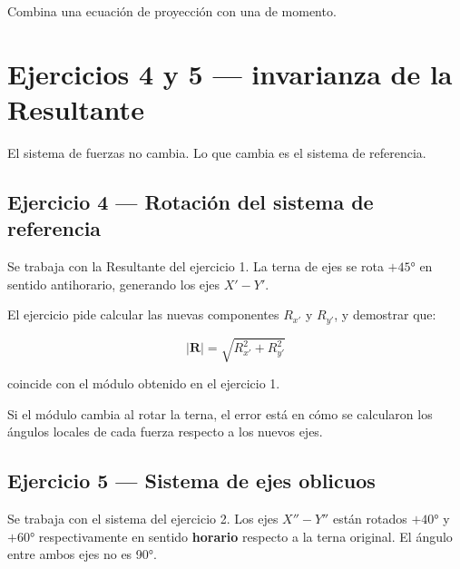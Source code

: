 \documentclass[
  spanish,
  11pt,
  a4paper,
]{article}
\begin{document}
Combina una ecuación de proyección con una de momento.

\section{Ejercicios 4 y 5 --- invarianza de la
Resultante}\label{ejercicios-4-y-5-invarianza-de-la-resultante}

El sistema de fuerzas no cambia. Lo que cambia es el sistema de
referencia.

\subsection{Ejercicio 4 --- Rotación del sistema de
referencia}\label{ejercicio-4-rotaciuxf3n-del-sistema-de-referencia}

Se trabaja con la Resultante del ejercicio 1. La terna de ejes se rota
\(+45°\) en sentido antihorario, generando los ejes \(X' - Y'\).

El ejercicio pide calcular las nuevas componentes \(R_{x'}\) y
\(R_{y'}\), y demostrar que:

\[|\mathbf{R}| = \sqrt{R_{x'}^2 + R_{y'}^2}\]

coincide con el módulo obtenido en el ejercicio 1.

\begin{tcolorbox}[enhanced jigsaw, bottomrule=.15mm, bottomtitle=1mm, titlerule=0mm, leftrule=.75mm, rightrule=.15mm, title=\textcolor{quarto-callout-tip-color}{\faLightbulb}\hspace{0.5em}{Tip}, coltitle=black, colframe=quarto-callout-tip-color-frame, left=2mm, opacitybacktitle=0.6, opacityback=0, toptitle=1mm, toprule=.15mm, colbacktitle=quarto-callout-tip-color!10!white, colback=white, breakable, arc=.35mm]

Si el módulo cambia al rotar la terna, el error está en cómo se
calcularon los ángulos locales de cada fuerza respecto a los nuevos
ejes.

\end{tcolorbox}

\subsection{Ejercicio 5 --- Sistema de ejes
oblicuos}\label{ejercicio-5-sistema-de-ejes-oblicuos}

Se trabaja con el sistema del ejercicio 2. Los ejes \(X'' - Y''\) están
rotados \(+40°\) y \(+60°\) respectivamente en sentido \textbf{horario}
respecto a la terna original. El ángulo entre ambos ejes no es 90°.
\end{document}
